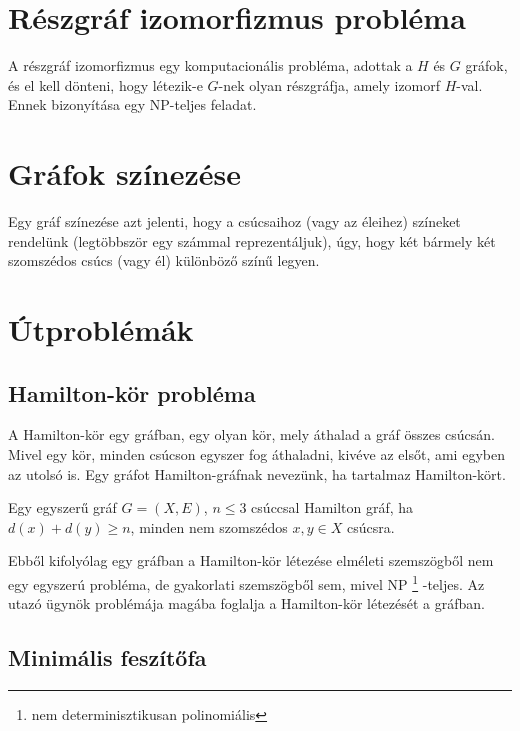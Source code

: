 \section{Részgráf izomorfizmus probléma}\label{sec:ALAP:adatelem}

A részgráf izomorfizmus egy komputacionális probléma, adottak a \(H\) és \(G\) gráfok, és el kell dönteni, hogy létezik-e \(G\)-nek olyan részgráfja, amely izomorf \(H\)-val. Ennek bizonyítása egy NP-teljes feladat.

\section{Gráfok színezése}\label{sec:ALAP:adatelem}

Egy gráf színezése azt jelenti, hogy a csúcsaihoz (vagy az éleihez) színeket rendelünk (legtöbbször egy számmal reprezentáljuk), úgy, hogy két bármely két szomszédos csúcs (vagy él) különböző színű legyen.

\section{Útproblémák}\label{sec:ALAP:adatelem}

\subsection{Hamilton-kör probléma}

A Hamilton-kör egy gráfban, egy olyan kör, mely áthalad a gráf összes csúcsán. Mivel egy kör, minden csúcson egyszer fog áthaladni, kivéve az elsőt, ami egyben az utolsó is. Egy gráfot Hamilton-gráfnak nevezünk, ha tartalmaz Hamilton-kört.

Egy egyszerű gráf \(G = (X,E)\), \(n \leq 3\) csúccsal Hamilton gráf, ha \(d(x) + d(y)  \geq n\), minden nem szomszédos \(x,y \in X\) csúcsra.

Ebből kifolyólag egy gráfban a Hamilton-kör létezése elméleti szemszögből nem egy egyszerú probléma, de gyakorlati szemszögből sem, mivel NP%
\footnote{ %
	nem determinisztikusan polinomiális
}  %
-teljes. Az utazó ügynök problémája magába foglalja a Hamilton-kör létezését a gráfban.

\subsection{Minimális feszítőfa}

